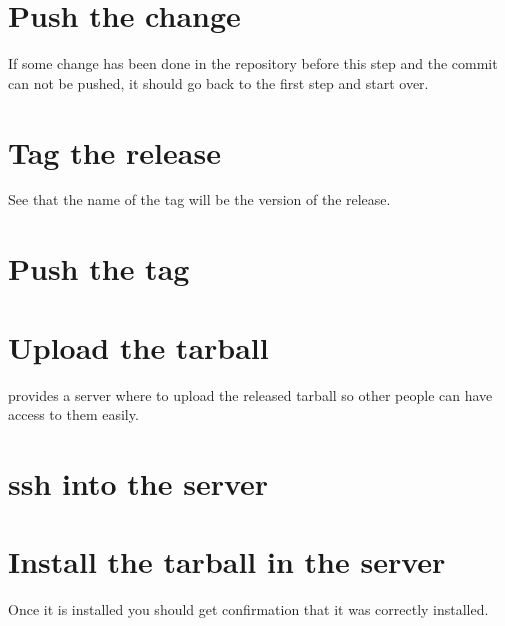 \section*{Push the change}

\noindent{}

If some change has been done in the repository before this step and the commit can not be pushed, it should go back to the first step and start over.

\section*{Tag the release}

\noindent{}

See that the name of the tag will be the version of the release.

\section*{Push the tag}

\noindent{}

\newpage
\section*{Upload the tarball}

\GNOME provides a server where to upload the released tarball so other people can have access to them easily.

\noindent{}

\section*{ssh into the server}

\noindent{}

\section*{Install the tarball in the server}

\noindent{}

Once it is installed you should get confirmation that it was correctly installed.
